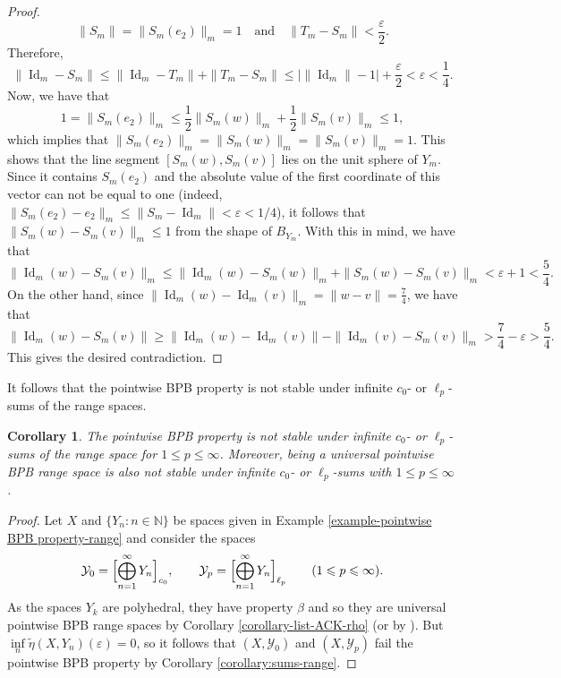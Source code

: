 \documentclass[a4paper,10pt]{amsart}
\theoremstyle{plain}
\newtheorem{corollary}[theorem]{Corollary}
\theoremstyle{definition}
\DeclareMathOperator{\Id}{\mathrm{Id}}
\newcommand{\N}{\mathbb{N}}
\newcommand{\eps}{\varepsilon}
\renewcommand{\geq}{\geqslant}
\renewcommand{\leq}{\leqslant}
\begin{document}
\begin{proof}
\begin{equation*}
\|S_m\| = \|S_m(e_2)\|_m = 1 \quad \text{and} \quad \left\|T_{m} - S_m \right\| < \frac{\eps}{2}.
\end{equation*}
Therefore,
$$
\|\Id_m-S_m\|\leq \|\Id_m - T_m\| + \|T_m-S_m\|\leq \bigl|\|\Id_m\|-1\bigr| + \frac{\eps}{2}<\eps <\frac{1}{4}.
$$
Now, we have that
\begin{equation*}
1 = \|S_m(e_2)\|_m \leq \frac{1}{2} \|S_m(w)\|_m + \frac{1}{2}\|S_m(v) \|_m \leq 1,
\end{equation*}
which implies that $\|S_m(e_2)\|_m = \|S_m(w)\|_m = \|S_m(v)\|_m = 1$. This shows that the line segment $[S_m(w), S_m(v)]$ lies on the unit sphere of $Y_m$. Since it contains $S_m(e_2)$ and the absolute value of the first coordinate of this vector can not be equal to one (indeed, $\|S_m(e_2)-e_2\|_m\leq \|S_m-\Id_m\|<\eps<1/4$), it follows that $\|S_m(w) - S_m(v)\|_m \leq 1$ from the shape of $B_{Y_m}$. With this in mind, we have that
\begin{equation*}
\|\Id_{m}(w) - S_m(v)\|_m \leq \|\Id_{m} (w) - S_m(w)\|_m + \|S_m(w) - S_m(v)\|_m < \eps + 1 < \frac{5}{4}.
\end{equation*}
On the other hand, since $\|\Id_{m}(w) - \Id_{m}(v)\|_m = \|w - v\| = \frac{7}{4}$, we have that
\begin{equation*}
\|\Id_{m}(w) - S_m(v)\| \geq \|\Id_{m}(w) - \Id_{m}(v)\| - \|\Id_{m}(v) - S_m(v)\|_m > \frac{7}{4} - \eps > \frac{5}{4}.	
\end{equation*}
This gives the desired contradiction.
\end{proof}


It follows that the pointwise BPB property is not stable under infinite $c_0$- or $\ell_p$-sums of the range spaces.

\begin{corollary}
The pointwise BPB property is not stable under infinite $c_0$- or $\ell_p$-sums of the range space  for $1\leq p \leq \infty$. Moreover, being a universal pointwise BPB range space is also not stable under infinite $c_0$- or $\ell_p$-sums with $1\leq p \leq \infty$.
\end{corollary}

\begin{proof}
Let $X$ and $\{Y_n\colon n\in \N\}$ be spaces given in Example \ref{example-pointwise BPB property-range} and consider the spaces
$$
\mathcal{Y}_0=\Bigl[\bigoplus_{n=1}^\infty Y_n\Bigr]_{c_0}, \qquad \mathcal{Y}_p=\Bigl[\bigoplus_{n=1}^\infty Y_n\Bigr]_{\ell_p} \qquad (1\leq p \leq \infty).
$$
As the spaces $Y_k$ are polyhedral, they have property $\beta$ and so they are universal pointwise BPB range spaces by Corollary \ref{corollary-list-ACK-rho} (or by \cite[Proposition 2.4]{DKL}). But $\inf\limits_n\tilde\eta(X,Y_n)(\eps)=0$, so it follows that $(X,\mathcal{Y}_0)$ and $(X,\mathcal{Y}_p)$ fail the pointwise BPB property by Corollary \ref{corollary:sums-range}.
\end{proof}
\end{document}
